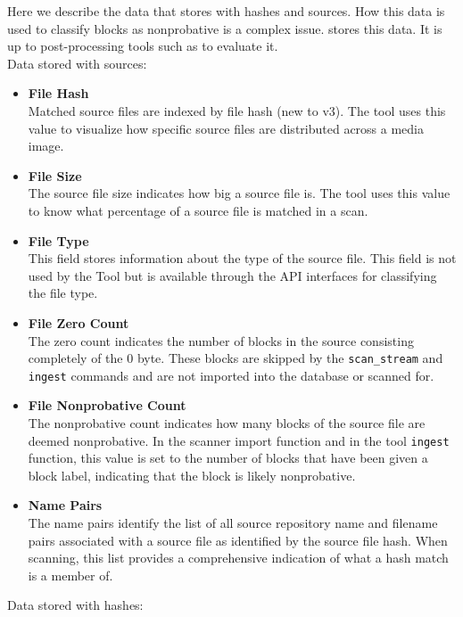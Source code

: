 \documentclass[11pt,fleqn]{article} %
\begin{document}
Here we describe the data that \hdb stores with hashes and sources. How this data is used to classify blocks as nonprobative is a complex issue. \hdb stores this data. It is up to post-processing tools such as \sscope to evaluate it.\\

Data stored with sources:
\begin{itemize}
\item \textbf{File Hash}\\
Matched source files are indexed by file hash (new to \hdb v3). The \sscope tool uses this value to visualize how specific source files are distributed across a media image.
\item \textbf{File Size}\\
The source file size indicates how big a source file is. The \sscope tool uses this value to know what percentage of a source file is matched in a scan.
\item \textbf{File Type}\\
This field stores information about the type of the source file. This field is not used by the \hdb Tool but is available through the \hdb API interfaces for classifying the file type.
\item \textbf{File Zero Count}\\
The zero count indicates the number of blocks in the source consisting completely of the 0 byte.  These blocks are skipped by the \hdb \verb+scan_stream+ and \verb+ingest+ commands and are not imported into the database or scanned for.
\item \textbf{File Nonprobative Count}\\
The nonprobative count indicates how many blocks of the source file are deemed nonprobative. In the \bulk \hdb scanner import function and in the \hdb tool \verb+ingest+ function, this value is set to the number of blocks that have been given a block label, indicating that the block is likely nonprobative.
\item \textbf{Name Pairs}\\
The name pairs identify the list of all source repository name and filename pairs associated with a source file as identified by the source file hash. When scanning, this list provides a comprehensive indication of what a hash match is a member of.
\end{itemize}
Data stored with hashes:
\end{document}

